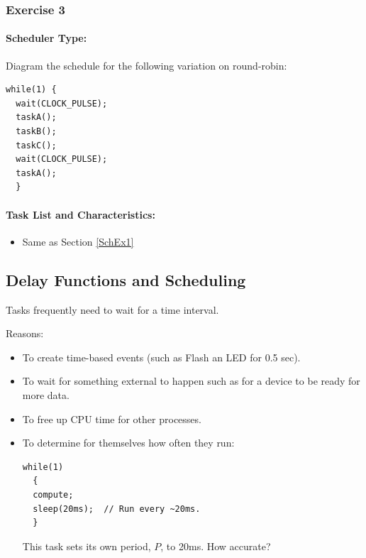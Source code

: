 \subsubsection{Exercise 3}

\paragraph{Scheduler Type:} Diagram the schedule for the following
         variation on round-robin:
\begin{verbatim}
while(1) {
  wait(CLOCK_PULSE);
  taskA();
  taskB();
  taskC();
  wait(CLOCK_PULSE);
  taskA();
  }
\end{verbatim} 
\paragraph{Task List and Characteristics:} 
\begin{itemize}
\item Same as Section \ref{SchEx1}
\end{itemize}
%


\subsection*{Delay Functions and Scheduling}

Tasks frequently need to wait for a time interval.

Reasons:
\begin{itemize}
  \item To create time-based events (such as Flash an LED for 0.5 sec).
  \item To wait for something external to happen such as for a device to
           be ready for more data.
  \item To free up CPU time for other processes.
  \item To determine for themselves how often they run:
\begin{verbatim}
while(1)
  {
  compute;
  sleep(20ms);  // Run every ~20ms.
  }
\end{verbatim}
This task sets its own period, $P$, to 20ms.
How accurate?

\end{itemize}

